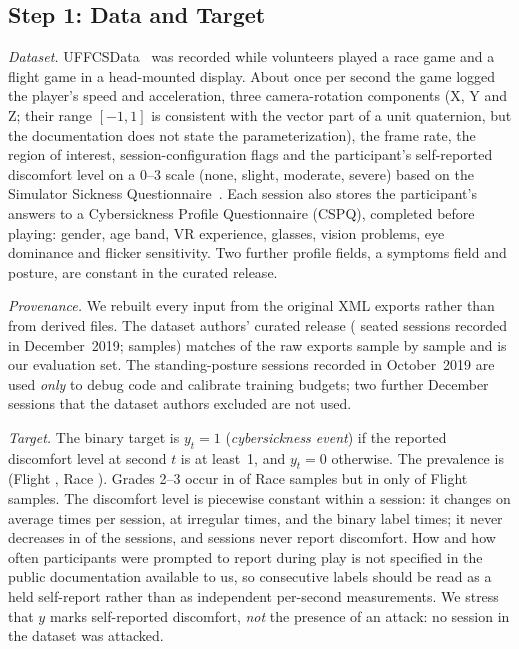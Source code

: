 \subsection{Step 1: Data and Target}
\label{sec:data}
\emph{Dataset.} UFFCSData~\cite{porcino2019uffcsdata,porcino2022identifying,porcino2021methodology} was recorded while volunteers played a race game and a flight game in a head-mounted display. About once per second the game logged the player's speed and acceleration, three camera-rotation components (X, Y and Z; their range $[-1,1]$ is consistent with the vector part of a unit quaternion, but the documentation does not state the parameterization), the frame rate, the region of interest, session-configuration flags and the participant's self-reported discomfort level on a 0--3 scale (none, slight, moderate, severe) based on the Simulator Sickness Questionnaire~\cite{kennedy1993ssq,porcino2019demo}. Each session also stores the participant's answers to a Cybersickness Profile Questionnaire (CSPQ), completed before playing: gender, age band, VR experience, glasses, vision problems, eye dominance and flicker sensitivity. Two further profile fields, a symptoms field and posture, are constant in the curated release.

\emph{Provenance.} We rebuilt every input from the original XML exports rather than from derived files. The dataset authors' curated release (\nSessionsEval{} seated sessions recorded in December~2019; \nSamplesEval{} samples) matches \nSessionsEval{} of the raw exports sample by sample and is our evaluation set. The \nSessionsDev{} standing-posture sessions recorded in October~2019 are used \emph{only} to debug code and calibrate training budgets; two further December sessions that the dataset authors excluded are not used.

\emph{Target.} The binary target is $y_t=1$ (\emph{cybersickness event}) if the reported discomfort level at second $t$ is at least~1, and $y_t=0$ otherwise. The prevalence is \prevEval{} (Flight \prevFlight{}, Race \prevRace{}). Grades 2--3 occur in \PHGradeRaceSevere{} of \PHGradeRaceSamples{} Race samples but in only \PHGradeFlightSevere{} of \PHGradeFlightSamples{} Flight samples. The discomfort level is piecewise constant within a session: it changes on average \PHLabelGradeChanges{} times per session, at irregular times, and the binary label \PHLabelBinaryChanges{} times; it never decreases in \PHLabelNonDecreasing{} of the \PHLabelSessions{} sessions, and \nEventFreeSessions{} sessions never report discomfort. How and how often participants were prompted to report during play is not specified in the public documentation available to us, so consecutive labels should be read as a held self-report rather than as independent per-second measurements. We stress that $y$ marks self-reported discomfort, \emph{not} the presence of an attack: no session in the dataset was attacked.

